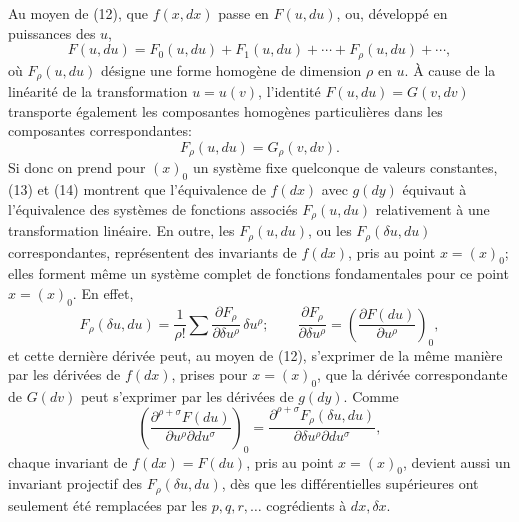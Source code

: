 Au moyen de (12), que \(f(x,dx)\) passe en \(F(u,du)\), ou, développé en
puissances des \(u\),
\begin{equation}
F(u,du)=F_0(u,du)+F_1(u,du)+\cdots+F_\rho(u,du)+\cdots ,
\tag{13}
\end{equation}
où \(F_\rho(u,du)\) désigne une forme homogène de dimension \(\rho\) en
\(u\). À cause de la linéarité de la transformation \(u=u(v)\), l'identité
\(F(u,du)=G(v,dv)\) transporte également les composantes homogènes
particulières dans les composantes correspondantes:
\begin{equation}
F_\rho(u,du)=G_\rho(v,dv).
\tag{14}
\end{equation}
Si donc on prend pour \((x)_0\) un système fixe quelconque de valeurs
constantes, (13) et (14) montrent que l'équivalence de \(f(dx)\) avec
\(g(dy)\) équivaut à l'équivalence des systèmes de fonctions associés
\(F_\rho(u,du)\) relativement à une transformation linéaire. En outre,
les \(F_\rho(u,du)\), ou les \(F_\rho(\delta u,du)\) correspondantes,
représentent des invariants de \(f(dx)\), pris au point \(x=(x)_0\);
elles forment même un système complet de fonctions fondamentales pour
ce point \(x=(x)_0\). En effet,
\[
F_\rho(\delta u,du)=\frac1{\rho!}\sum
\frac{\partial F_\rho}{\partial \delta u^\rho}\,\delta u^\rho;
\qquad
\frac{\partial F_\rho}{\partial \delta u^\rho}
=\left(\frac{\partial F(du)}{\partial u^\rho}\right)_0,
\]
et cette dernière dérivée peut, au moyen de (12), s'exprimer de la même
manière par les dérivées de \(f(dx)\), prises pour \(x=(x)_0\), que la
dérivée correspondante de \(G(dv)\) peut s'exprimer par les dérivées de
\(g(dy)\). Comme
\[
\left(\frac{\partial^{\rho+\sigma}F(du)}
{\partial u^\rho\partial du^\sigma}\right)_0
=
\frac{\partial^{\rho+\sigma}F_\rho(\delta u,du)}
{\partial\delta u^\rho\partial du^\sigma},
\]
chaque invariant de \(f(dx)=F(du)\), pris au point \(x=(x)_0\), devient
aussi un invariant projectif des \(F_\rho(\delta u,du)\), dès que les
différentielles supérieures ont seulement été remplacées par les
\(p,q,r,\ldots\) cogrédients à \(dx,\delta x\).

